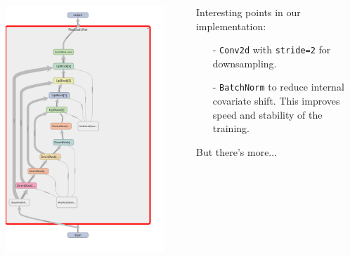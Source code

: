 \documentclass[footline=authortitle]{beamer}
\begin{document}
\begin{frame}
    \begin{columns}
        \begin{column}{0.55\textwidth}
            \includegraphics[width=0.9\textwidth]{images/unet_experiment_graph.png}
        \end{column}
        \begin{column}{0.55\textwidth}
            Interesting points in our implementation:
            \begin{itemize}
                \item[-] \texttt{Conv2d} with \texttt{stride=2} for downsampling.
                \item[-] \texttt{BatchNorm} to reduce internal covariate shift. This improves speed and stability of the training.
            \end{itemize}
            But there's more...
        \end{column}
    \end{columns}
\end{frame}
\end{document}
